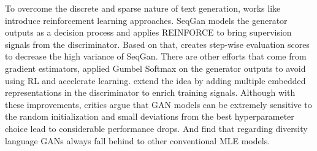 \documentclass[12pt]{report}
\begin{document}
To overcome the discrete and sparse nature of text generation, works like \cite{yu2017seqgan,nie2018relgan} introduce reinforcement learning approaches. SeqGan\cite{yu2017seqgan} models the generator outputs as a decision process and applies REINFORCE to bring supervision signals from the discriminator. Based on that, \cite{tuan2019improving} creates step-wise evaluation scores to decrease the high variance of SeqGan. There are other efforts that come from gradient estimators, \cite{kusner2016gans} applied Gumbel Softmax on the generator outputs to avoid using RL and accelerate learning. \cite{nie2018relgan} extend the idea by adding multiple embedded representations in the discriminator to enrich training signals. Although with these improvements, critics argue that GAN models can be extremely sensitive to the random initialization and small deviations from the best hyperparameter choice lead to considerable performance drops\cite{semeniuta2018accurate}. And \cite{caccia2018language} find that regarding diversity language GANs always fall behind to other conventional MLE models.


\end{document}
